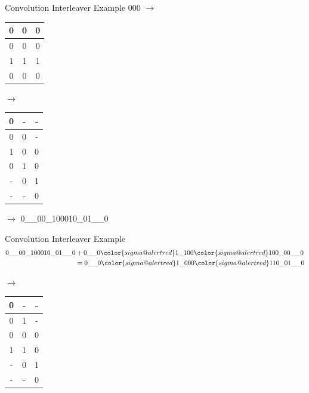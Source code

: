 \documentclass[aspectratio=169]{beamer}
\makeatletter
\newcommand{\err}[1]{{\color{sigma@alertred}#1}}
\makeatother
\begin{document}
\begin{frame}{Convolution Interleaver Example}
    000    \pause $\to$ \\
    \begin{table}
        \centering
        \begin{tabular}{|c|c|c|}
            \hline 
            0 & 0 & 0 \\ \hline
            0 & 0 & 0 \\ \hline
            1 & 1 & 1 \\ \hline
            0 & 0 & 0 \\ \hline
        \end{tabular}
    \end{table} \pause

    $\to$

    \begin{table}
        \centering
        \begin{tabular}{|c|c|c|}
            \hline 
            0 & - & - \\ \hline
            0 & 0 & - \\ \hline
            1 & 0 & 0 \\ \hline
            0 & 1 & 0 \\ \hline
            - & 0 & 1 \\ \hline
            - & - & 0 \\ \hline
        \end{tabular}
    \end{table} \pause

    $\to$ 0\_\_00\_100010\_01\_\_0
\end{frame}


\begin{frame}{Convolution Interleaver Example}
    \begin{align*}
    0\_\_00\_100010\_01\_\_0 &+ 0\_\_0\err{1\_1}00\err{1}00\_00\_\_0 \\
    &= 0\_\_0\err{1\_0}00\err{1}10\_01\_\_0
    \end{align*} \pause

    $\to$

    \begin{table}
        \centering
        \begin{tabular}{|c|c|c|}
            \hline 
            0 & - & - \\ \hline
            0 & \err{1} & \err{-} \\ \hline
            \err{0} & 0 & 0 \\ \hline
            \err{1} & 1 & 0 \\ \hline
            - & 0 & 1 \\ \hline
            - & - & 0 \\ \hline
        \end{tabular}
    \end{table}
\end{frame}
\end{document}
